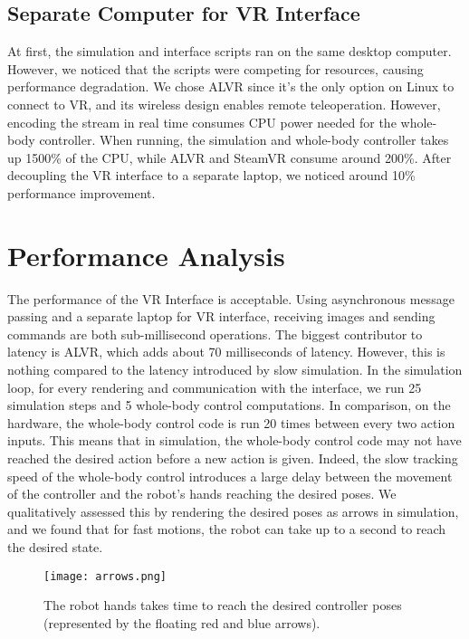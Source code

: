 \subsection{Separate Computer for VR Interface}

At first, the simulation and interface scripts ran on the same desktop computer. However, we noticed that the scripts were competing for resources, causing performance degradation. We chose ALVR since it's the only option on Linux to connect to VR, and its wireless design enables remote teleoperation. However, encoding the stream in real time consumes CPU power needed for the whole-body controller. When running, the simulation and whole-body controller takes up 1500\% of the CPU, while ALVR and SteamVR consume around 200\%. After decoupling the VR interface to a separate laptop, we noticed around 10\% performance improvement.

\section{Performance Analysis}
The performance of the VR Interface is acceptable. Using asynchronous message passing and a separate laptop for VR interface, receiving images and sending commands are both sub-millisecond operations. The biggest contributor to latency is ALVR, which adds about 70 milliseconds of latency. However, this is nothing compared to the latency introduced by slow simulation. In the simulation loop, for every rendering and communication with the interface, we run 25 simulation steps and 5 whole-body control computations. In comparison, on the hardware, the whole-body control code is run 20 times between every two action inputs. This means that in simulation, the whole-body control code may not have reached the desired action before a new action is given. Indeed, the slow tracking speed of the whole-body control introduces a large delay between the movement of the controller and the robot's hands reaching the desired poses. We qualitatively assessed this by rendering the desired poses as arrows in simulation, and we found that for fast motions, the robot can take up to a second to reach the desired state. 
\begin{figure}
	\centering
	\texttt{[image: arrows.png]}
	\caption{The robot hands takes time to reach the desired controller poses (represented by the floating red and blue arrows).}
    \label{fig:arrows}
\end{figure}

